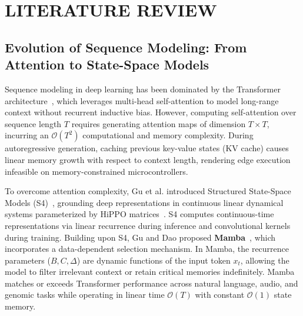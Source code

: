 \documentclass[11pt,a4paper,oneside]{report}
\begin{document}
\chapter{LITERATURE REVIEW}
\label{Chapter2}
\rhead{}

\section{Evolution of Sequence Modeling: From Attention to State-Space Models}
Sequence modeling in deep learning has been dominated by the Transformer architecture~\cite{vaswani2017attention}, which leverages multi-head self-attention to model long-range context without recurrent inductive bias. However, computing self-attention over sequence length $T$ requires generating attention maps of dimension $T \times T$, incurring an $\mathcal{O}(T^2)$ computational and memory complexity. During autoregressive generation, caching previous key-value states (KV cache) causes linear memory growth with respect to context length, rendering edge execution infeasible on memory-constrained microcontrollers.

To overcome attention complexity, Gu et al. introduced Structured State-Space Models (S4)~\cite{gu2021efficiently}, grounding deep representations in continuous linear dynamical systems parameterized by HiPPO matrices~\cite{gu2020hippo}. S4 computes continuous-time representations via linear recurrence during inference and convolutional kernels during training. Building upon S4, Gu and Dao proposed \textbf{Mamba}~\cite{gu2023mamba}, which incorporates a data-dependent selection mechanism. In Mamba, the recurrence parameters ($B, C, \Delta$) are dynamic functions of the input token $x_t$, allowing the model to filter irrelevant context or retain critical memories indefinitely. Mamba matches or exceeds Transformer performance across natural language, audio, and genomic tasks while operating in linear time $\mathcal{O}(T)$ with constant $\mathcal{O}(1)$ state memory.
\end{document}
